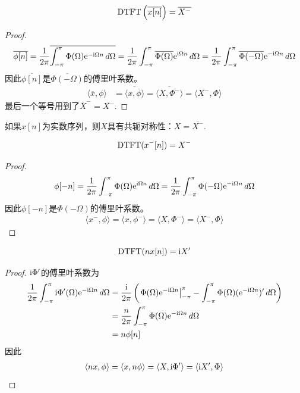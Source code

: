 \begin{proposition}[共轭性质]
    $$\operatorname{DTFT}\left(\overline{x[n]}\right)=\overline{X^-}$$
\end{proposition}
\begin{proof}
    $$\overline{\phi[n]}=\frac{1}{2\pi}\overline{\int_{-\pi}^\pi \Phi(\Omega)\mathrm{e}^{-\mathrm{i}\Omega n}\,d\Omega}=\frac{1}{2\pi}\int_{-\pi}^\pi \overline{\Phi(\Omega)}\mathrm{e}^{\mathrm{i}\Omega n}\,d\Omega=\frac{1}{2\pi}\int_{-\pi}^\pi \overline{\Phi(-\Omega)}\mathrm{e}^{-\mathrm{i}\Omega n}\,d\Omega$$
    因此$\overline{\phi[n]}$是$\overline{\Phi(-\Omega)}$的傅里叶系数。
    \begin{align*}
        \langle \overline{x},\phi\rangle & =\overline{\langle x,\overline{\phi}\rangle}=\overline{\langle X,\overline{\Phi^-}\rangle}=\langle \overline{X^-},\Phi\rangle
    \end{align*}
    最后一个等号用到了$\overline{X}^-=\overline{X^-}$.
\end{proof}
\begin{corollary}
    如果$x[n]$为实数序列，则$X$具有共轭对称性：$X=\overline{X^-}$.
\end{corollary}

\begin{proposition}[反转性质]
    $$\operatorname{DTFT}(x^-[n])=X^-$$
\end{proposition}
\begin{proof}
    $$\phi[-n]=\frac{1}{2\pi}\int_{-\pi}^\pi \Phi(\Omega)\mathrm{e}^{\mathrm{i}\Omega n}\,d\Omega=\frac{1}{2\pi}\int_{-\pi}^\pi \Phi(-\Omega)\mathrm{e}^{-\mathrm{i}\Omega n}\,d\Omega$$
    因此$\phi[-n]$是$\Phi(-\Omega)$的傅里叶系数。
    \begin{align*}
        \langle x^-,\phi\rangle=\langle x,\phi^-\rangle=\langle X,\Phi^-\rangle=\langle X^-,\Phi\rangle
    \end{align*}
\end{proof}

\begin{proposition}[频域微分性质]\label{prop:DTFT_derivative}
    $$\operatorname{DTFT}(nx[n])=\mathrm{i} X'$$
\end{proposition}
\begin{proof}
    $\mathrm{i} \Phi'$的傅里叶系数为
    \begin{align*}
        \frac{1}{2\pi}\int_{-\pi}^\pi \mathrm{i} \Phi'(\Omega)\mathrm{e}^{-\mathrm{i} \Omega n}\,d\Omega & =\frac{\mathrm{i}}{2\pi}\left(\left.\Phi(\Omega)\mathrm{e}^{-\mathrm{i} \Omega n}\right|_{-\pi}^{\pi}-\int_{-\pi}^\pi \Phi(\Omega)(\mathrm{e}^{-\mathrm{i} \Omega n})'\,d\Omega\right) \\
                                                                                   & =\frac{n}{2\pi}\int_{-\pi}^\pi \Phi(\Omega)\mathrm{e}^{-\mathrm{i}\Omega n}\,d\Omega                                                                       \\
                                                                                   & =n\phi[n]
    \end{align*}
    因此
    \begin{align*}
        \langle nx,\phi\rangle=\langle x,n\phi\rangle=\langle X,\mathrm{i}\Phi'\rangle=\langle \mathrm{i} X',\Phi\rangle
    \end{align*}
\end{proof}

